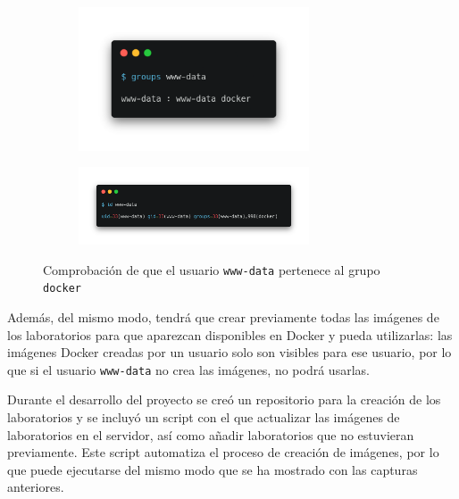         \begin{figure}[htbp]
            \centering
            \begin{subfigure}[!htbp]{\textwidth}
                \centering

                \includegraphics[width=0.75\textwidth]{images/Capturas/comandos/groups.png}
            \end{subfigure}
            \hfill
            \begin{subfigure}[!htbp]{\textwidth}
                \centering

                \includegraphics[width=0.75\textwidth]{images/Capturas/comandos/id.png}
            \end{subfigure}

            \caption{Comprobación de que el usuario \texttt{www-data} pertenece al grupo \texttt{docker}}
            \label{fig:grupo-docker}
        \end{figure}

        Además, del mismo modo, tendrá que crear previamente todas las imágenes de los laboratorios para que aparezcan disponibles en Docker y pueda utilizarlas: las imágenes Docker creadas por un usuario solo son visibles para ese usuario, por lo que si el usuario \texttt{www-data} no crea las imágenes, no podrá usarlas.

        Durante el desarrollo del proyecto se creó un repositorio para la creación de los laboratorios y se incluyó un script con el que actualizar las imágenes de laboratorios en el servidor, así como añadir laboratorios que no estuvieran previamente. Este script automatiza el proceso de creación de imágenes, por lo que puede ejecutarse del mismo modo que se ha mostrado con las capturas anteriores.

